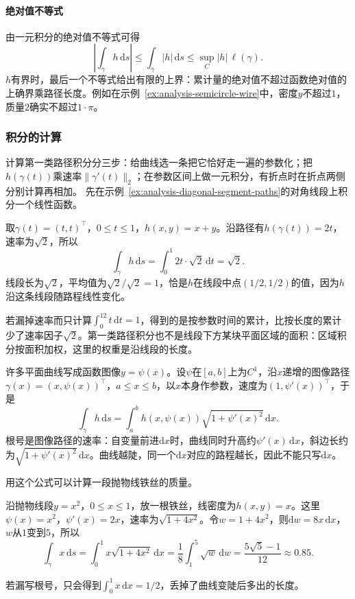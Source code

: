 \paragraph{绝对值不等式}

由一元积分的绝对值不等式可得
\[
 \left|\int_\gamma h\,\mathrm ds\right|
 \leq\int_\gamma|h|\,\mathrm ds
 \leq\sup_C|h|\,\ell(\gamma).
\]
$h$有界时，最后一个不等式给出有限的上界：累计量的绝对值不超过函数绝对值的上确界乘路径长度。例如在示例~\ref{ex:analysis-semicircle-wire}中，密度$y$不超过$1$，质量$2$确实不超过$1\cdot\pi$。

\subsubsection{积分的计算}

计算第一类路径积分分三步：给曲线选一条把它恰好走一遍的参数化；把$h(\gamma(t))$乘速率$\lVert\gamma'(t)\rVert_2$；在参数区间上做一元积分，有折点时在折点两侧分别计算再相加。
先在示例~\ref{ex:analysis-diagonal-segment-paths}的对角线段上积分一个线性函数。
\begin{example}[沿对角线段积分$x+y$]
取$\gamma(t)=(t,t)^\top$，$0\leq t\leq1$，$h(x,y)=x+y$。沿路径有$h(\gamma(t))=2t$，速率为$\sqrt2$，所以
\[
 \int_\gamma h\,\mathrm ds=\int_0^1 2t\cdot\sqrt2\,\mathrm dt=\sqrt2.
\]
线段长为$\sqrt2$，平均值为$\sqrt2/\sqrt2=1$，恰是$h$在线段中点$(1/2,1/2)$的值，因为$h$沿这条线段随路程线性变化。
\end{example}
若漏掉速率而只计算$\int_0^12t\,\mathrm dt=1$，得到的是按参数时间的累计，比按长度的累计少了速率因子$\sqrt2$。第一类路径积分也不是线段下方某块平面区域的面积：区域积分按面积加权，这里的权重是沿线段的长度。

许多平面曲线写成函数图像$y=\psi(x)$。设$\psi$在$[a,b]$上为$C^1$，沿$x$递增的图像路径$\gamma(x)=(x,\psi(x))^\top$，$a\leq x\leq b$，以$x$本身作参数，速度为$(1,\psi'(x))^\top$，于是
\[
 \int_\gamma h\,\mathrm ds
 =\int_a^b h(x,\psi(x))\sqrt{1+\psi'(x)^2}\,\mathrm dx.
\]
根号是图像路径的速率：自变量前进$\mathrm dx$时，曲线同时升高约$\psi'(x)\,\mathrm dx$，斜边长约为$\sqrt{1+\psi'(x)^2}\,\mathrm dx$。曲线越陡，同一个$\mathrm dx$对应的路程越长，因此不能只写$\mathrm dx$。

用这个公式可以计算一段抛物线铁丝的质量。
\begin{example}[抛物线铁丝的质量]
沿抛物线段$y=x^2$，$0\leq x\leq1$，放一根铁丝，线密度为$h(x,y)=x$。这里$\psi(x)=x^2$，$\psi'(x)=2x$，速率为$\sqrt{1+4x^2}$。令$w=1+4x^2$，则$\mathrm dw=8x\,\mathrm dx$，$w$从$1$变到$5$，所以
\[
 \int_\gamma x\,\mathrm ds=\int_0^1x\sqrt{1+4x^2}\,\mathrm dx
 =\frac18\int_1^5\sqrt w\,\mathrm dw=\frac{5\sqrt5-1}{12}\approx0.85.
\]
\end{example}
若漏写根号，只会得到$\int_0^1x\,\mathrm dx=1/2$，丢掉了曲线变陡后多出的长度。

